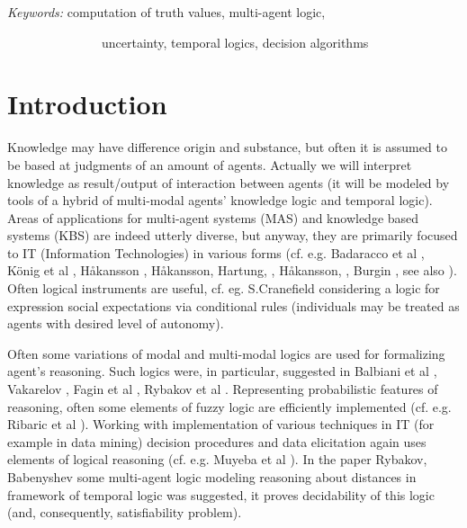 \documentclass[runningheads]{llncs}
\begin{document}
\medskip

{\sl Keywords:} computation of truth values, multi-agent logic,

\ \ \ \ \ \ \ \ \ \ \ \ \ \ \ uncertainty, temporal logics,  decision algorithms

\medskip










\section{Introduction}


Knowledge may have difference origin and substance, but often it is assumed to be based at judgments of an
amount of agents. Actually we will  interpret knowledge as result/output of  interaction
between agents (it will be modeled by tools of a hybrid of multi-modal
agents' knowledge logic and temporal logic).
 Areas of applications for multi-agent systems (MAS) and knowledge based systems (KBS) are indeed utterly diverse, but
anyway, they are primarily focused to IT (Information Technologies) in various forms (cf. e.g. Badaracco  et al
\cite{DBLP:conf/kes/BadaraccoM11},
 K{\"o}nig et al \cite{h11a}, H{\aa}kansson \cite{h11},
H{\aa}kansson,  Hartung, \cite{h10} , H{\aa}kansson, \cite{h10b},
Burgin \cite{DBLP:conf/kes/BurginM11}, see also
\cite{h10c,h10d,h10e,DBLP:conf/kes/2011-2}).
Often logical instruments are useful, cf. eg.
  S.Cranefield \cite{sc4}
 considering  a logic for expression social expectations via conditional rules (individuals may be treated as agents with desired level of autonomy).


 Often  some variations of
modal and multi-modal logics are used for formalizing agent's reasoning.
Such logics
were, in particular, suggested in Balbiani et al \cite{bal1},
Vakarelov \cite{DBLP:conf/rsfdgrc/Vakarelov05}, Fagin et al
\cite{DBLP:journals/ai/FaginHV95,fag1}, Rybakov et al
\cite{vris,rit07,DBLP:conf/kes/BabenyshevR09}.
Representing probabilistic features of reasoning, often some elements of fuzzy logic
are efficiently implemented (cf. e.g. Ribaric et al \cite{flrib}). Working with implementation of various techniques in IT (for example in data mining) decision procedures and data elicitation again uses elements of logical reasoning (cf. e.g.  Muyeba et al \cite{mm1}).
In the paper Rybakov, Babenyshev \cite{vris} some multi-agent logic
modeling reasoning about distances in framework of temporal logic
was suggested, it proves decidability of this logic (and,
consequently, satisfiability problem).
\end{document}
